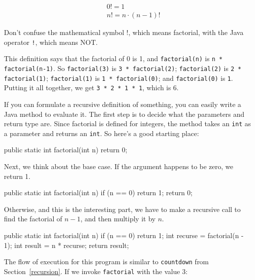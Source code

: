 \documentclass[12pt]{book}
\theoremstyle{exercise}
\newcommand{\java}[1]{\verb"#1"}
\begin{document}
\vspace{-1ex}
\begin{eqnarray*}
&&  0! = 1 \\
&&  n! = n \cdot(n-1)!
\end{eqnarray*}
\vspace{-1ex}

Don't confuse the mathematical symbol $!$, which means factorial, with the Java operator \java{!}, which means NOT.

This definition says that the factorial of 0 is 1, and \java{factorial(n)} is \java{n * factorial(n-1)}.
So \java{factorial(3)} is \java{3 * factorial(2)}; \java{factorial(2)} is \java{2 * factorial(1)}; \java{factorial(1)} is \java{1 * factorial(0)}; and \java{factorial(0)} is \java{1}.
Putting it all together, we get \java{3 * 2 * 1 * 1}, which is 6.

If you can formulate a recursive definition of something, you can easily write a Java method to evaluate it.
The first step is to decide what the parameters and return type are.
Since factorial is defined for integers, the method takes an \java{int} as a parameter and returns an \java{int}.
So here's a good starting place:

\begin{code}
    public static int factorial(int n) {
        return 0;
    }
\end{code}

Next, we think about the base case.
If the argument happens to be zero, we return 1.

\begin{code}
    public static int factorial(int n) {
        if (n == 0) {
            return 1;
        }
        return 0;
    }
\end{code}

Otherwise, and this is the interesting part, we have to make a recursive call to find the factorial of $n-1$, and then multiply it by $n$.

\begin{code}
    public static int factorial(int n) {
        if (n == 0) {
            return 1;
        }
        int recurse = factorial(n - 1);
        int result = n * recurse;
        return result;
    }
\end{code}

The flow of execution for this program is similar to \java{countdown} from Section~\ref{recursion}.
If we invoke \java{factorial} with the value 3:
\end{document}
